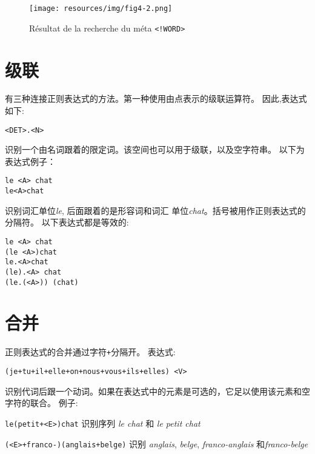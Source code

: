 \bigskip
\begin{figure}[h]
\begin{center}
\texttt{[image: resources/img/fig4-2.png]}
\caption{Résultat de la recherche du méta
\texttt{<!WORD>}\label{fig-search-<!WORD>}}
\end{center}
\end{figure}

\section{级联}

有三种连接正则表达式的方法。第一种使用由点表示的级联运算符。 因此,表达式如下:

\begin{verbatim}
<DET>.<N>
\end{verbatim}

\noindent 识别一个由名词跟着的限定词。该空间也可以用于级联，以及空字符串。
以下为表达式例子： 


\begin{verbatim}
le <A> chat
le<A>chat
\end{verbatim}

\noindent 识别词汇单位\textit{le}, 后面跟着的是形容词和词汇
单位\textit{chat}。括号被用作正则表达式的分隔符。
以下表达式都是等效的:


\begin{verbatim}
le <A> chat
(le <A>)chat
le.<A>chat
(le).<A> chat
(le.(<A>)) (chat)
\end{verbatim}

\section{合并}
\index{\verb$+$}
正则表达式的合并通过字符\verb$+$分隔开。 
表达式:

\begin{verbatim}
(je+tu+il+elle+on+nous+vous+ils+elles) <V>
\end{verbatim}

\noindent
识别代词后跟一个动词。如果在表达式中的元素是可选的，它足以使用该元素和空字符的联合。 
 例子:

\bigskip
\noindent \verb$le(petit+<E>)chat$ 识别序列 \textit{le chat}
和 \textit{le petit chat}

\smallskip
\noindent \verb$(<E>+franco-)(anglais+belge)$ 识别 \textit{anglais}, \textit{belge},
\textit{franco-anglais} 和\textit{franco-belge}

